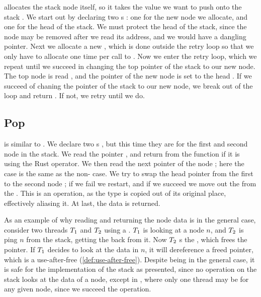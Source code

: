  allocates the stack node itself, so it takes the value we want to push onto the stack
. We start out by declaring two s : one for the new node we
allocate, and one for the head of the stack. We must protect the head of the stack, since the node
may be removed after we read its address, and we would have a dangling pointer.  Next we allocate a
new  , which is done outside the retry loop so that we only have to
allocate one time per call to . Now we enter the retry loop, which we repeat until we
succeed in changing the top pointer of the stack to our new node.
The top node is read , and the  pointer of the new node is set to the head
. If we succeed of chaning the   pointer of the stack to our new node, we
break out of the loop and return . If not, we retry until we do.


\subsection{Pop}

 is similar to . We declare two s , but this time
they are for the first and second node in the stack. We read the  pointer ,
and return from the function if it is  using the  Rust operator. We then read
the next pointer of the node ; here the  case is the same as the
non- case. We try to swap the head pointer from the first to the second node
; if we fail we restart, and if we succeed we move out the  from the
. This is an  operation, as the type is copied out of its original place,
effectively aliasing it. At last, the data is returned.

As an example of why reading and returning the node data is  in the general case,
consider two threads $T\sb{1}$ and $T\sb{2}$ using a . $T\sb{1}$ is looking at
a node $n$, and $T\sb{2}$ is ping $n$ from the stack, getting the  back from
it. Now $T\sb{2}$ s the , which frees the pointer. If $T\sb{1}$ decides to
look at the data in $n$, it will dereference a freed pointer, which is a use-after-free
(\cref{def:use-after-free}). Despite being  in the general case, it is safe for the
implementation of the stack as presented, since no operation on the stack looks at the data of a
node, except in , where only one thread may be for any given node, since we succeed
the  operation.




